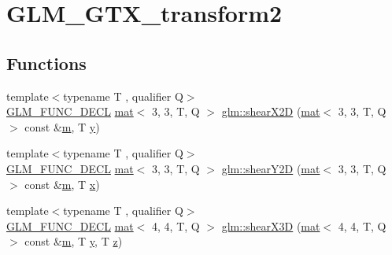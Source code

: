 \hypertarget{group__gtx__transform2}{}\section{G\+L\+M\+\_\+\+G\+T\+X\+\_\+transform2}
\label{group__gtx__transform2}
\subsection*{Functions}
\begin{DoxyCompactItemize}
\item 
{\footnotesize template$<$typename T , qualifier Q$>$ }\\\mbox{\hyperlink{setup_8hpp_ab2d052de21a70539923e9bcbf6e83a51}{G\+L\+M\+\_\+\+F\+U\+N\+C\+\_\+\+D\+E\+CL}} \mbox{\hyperlink{structglm_1_1mat}{mat}}$<$ 3, 3, T, Q $>$ \mbox{\hyperlink{group__gtx__transform2_gabf714b8a358181572b32a45555f71948}{glm\+::shear\+X2D}} (\mbox{\hyperlink{structglm_1_1mat}{mat}}$<$ 3, 3, T, Q $>$ const \&\mbox{\hyperlink{_s_d_l__opengl__glext_8h_af593500c283bf1a787a6f947f503a5c2}{m}}, T \mbox{\hyperlink{_s_d_l__opengl_8h_a1675d9d7bb68e1657ff028643b4037e3}{y}})
\item 
{\footnotesize template$<$typename T , qualifier Q$>$ }\\\mbox{\hyperlink{setup_8hpp_ab2d052de21a70539923e9bcbf6e83a51}{G\+L\+M\+\_\+\+F\+U\+N\+C\+\_\+\+D\+E\+CL}} \mbox{\hyperlink{structglm_1_1mat}{mat}}$<$ 3, 3, T, Q $>$ \mbox{\hyperlink{group__gtx__transform2_gac7998d0763d9181550c77e8af09a182c}{glm\+::shear\+Y2D}} (\mbox{\hyperlink{structglm_1_1mat}{mat}}$<$ 3, 3, T, Q $>$ const \&\mbox{\hyperlink{_s_d_l__opengl__glext_8h_af593500c283bf1a787a6f947f503a5c2}{m}}, T \mbox{\hyperlink{_s_d_l__opengl_8h_ad0e63d0edcdbd3d79554076bf309fd47}{x}})
\item 
{\footnotesize template$<$typename T , qualifier Q$>$ }\\\mbox{\hyperlink{setup_8hpp_ab2d052de21a70539923e9bcbf6e83a51}{G\+L\+M\+\_\+\+F\+U\+N\+C\+\_\+\+D\+E\+CL}} \mbox{\hyperlink{structglm_1_1mat}{mat}}$<$ 4, 4, T, Q $>$ \mbox{\hyperlink{group__gtx__transform2_ga73e867c6cd4d700fe2054437e56106c4}{glm\+::shear\+X3D}} (\mbox{\hyperlink{structglm_1_1mat}{mat}}$<$ 4, 4, T, Q $>$ const \&\mbox{\hyperlink{_s_d_l__opengl__glext_8h_af593500c283bf1a787a6f947f503a5c2}{m}}, T \mbox{\hyperlink{_s_d_l__opengl_8h_a1675d9d7bb68e1657ff028643b4037e3}{y}}, T \mbox{\hyperlink{_s_d_l__opengl__glext_8h_a5e74030ebb3297ce1b37ff716fedd68f}{z}})
\item 

\end{DoxyCompactItemize}
